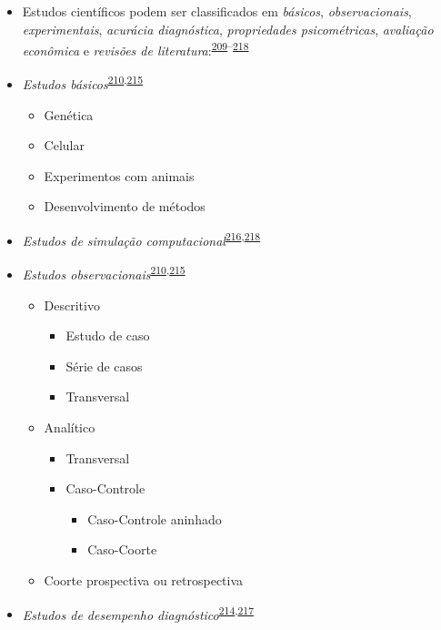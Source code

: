 \documentclass[
  a4paper,
]{book}
\begin{document}
\begin{itemize}
\item
  Estudos científicos podem ser classificados em \emph{básicos}, \emph{observacionais}, \emph{experimentais}, \emph{acurácia diagnóstica}, \emph{propriedades psicométricas}, \emph{avaliação econômica} e \emph{revisões de literatura}:\textsuperscript{\protect\hyperlink{ref-Grant2009}{209}--\protect\hyperlink{ref-chipman2022}{218}}
\item
  \emph{Estudos básicos}\textsuperscript{\protect\hyperlink{ref-Suxfct2014}{210},\protect\hyperlink{ref-Chidambaram2019}{215}}

  \begin{itemize}
  \item
    Genética
  \item
    Celular
  \item
    Experimentos com animais
  \item
    Desenvolvimento de métodos
  \end{itemize}
\item
  \emph{Estudos de simulação computacional}\textsuperscript{\protect\hyperlink{ref-Erdemir2020}{216},\protect\hyperlink{ref-chipman2022}{218}}
\item
  \emph{Estudos observacionais}\textsuperscript{\protect\hyperlink{ref-Suxfct2014}{210},\protect\hyperlink{ref-Chidambaram2019}{215}}

  \begin{itemize}
  \item
    Descritivo

    \begin{itemize}
    \item
      Estudo de caso
    \item
      Série de casos
    \item
      Transversal
    \end{itemize}
  \item
    Analítico

    \begin{itemize}
    \item
      Transversal
    \item
      Caso-Controle

      \begin{itemize}
      \item
        Caso-Controle aninhado
      \item
        Caso-Coorte
      \end{itemize}
    \end{itemize}
  \item
    Coorte prospectiva ou retrospectiva
  \end{itemize}
\item
  \emph{Estudos de desempenho diagnóstico}\textsuperscript{\protect\hyperlink{ref-Chassuxe92019}{214},\protect\hyperlink{ref-Yang2021}{217}}


\end{itemize}
\end{document}

